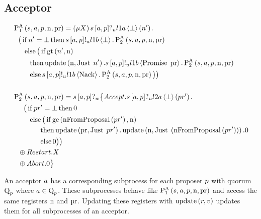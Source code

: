 \subsection{Acceptor}
\begin{align*}
&\operatorname{P^{A}_{1}}\left(s, a, p, \operatorname{n}, \operatorname{pr}\right) = \left(\mu X\right) s\left[a, p\right]?_u l1a \left\langle \bot \right\rangle \left(n'\right) .\\
&\hspace*{0.75em * 1}\big ( \operatorname{if} n' = \bot \operatorname{then} s\left[a, p\right]!_u l1b \left\langle \bot \right\rangle.\operatorname{P^{A}_{2}}\left(s, a, p, \operatorname{n}, \operatorname{pr}\right)\\
&\hspace*{0.75em * 2}\operatorname{else} \big( \operatorname{if} \operatorname{gt}\left(n', \operatorname{n}\right)\\
&\hspace*{0.75em * 3}\operatorname{then} \operatorname{update} \left(\operatorname{n}, \operatorname{Just}\; n'\right).s\left[a, p\right]!_u l1b \left\langle \operatorname{Promise}\; \operatorname{pr} \right\rangle.\operatorname{P^{A}_{2}}\left(s, a, p, \operatorname{n}, \operatorname{pr}\right)\\
&\hspace*{0.75em * 3}\operatorname{else} s\left[a, p\right]!_u l1b \left\langle \operatorname{Nack} \right\rangle.\operatorname{P^{A}_{2}}\left(s, a, p, \operatorname{n}, \operatorname{pr}\right)
\big ) \big )
\\\\
&\operatorname{P^{A}_{2}}\left(s, a, p, \operatorname{n}, \operatorname{pr}\right) = s\left[a, p\right]?_w \big\{\mathnormal{Accept} . s\left[a, p\right]?_u l2a \left\langle \bot \right\rangle \left(pr'\right) .\\
&\hspace*{0.75em * 2}\big( \operatorname{if} pr' = \bot \operatorname{then} 0\\
&\hspace*{0.75em * 3}\operatorname{else} \big( \operatorname{if} \operatorname{ge}\left(\operatorname{nFromProposal}\left(pr' \right), \operatorname{n}\right)\\
&\hspace*{0.75em * 5}\operatorname{then} \operatorname{update} \left(\operatorname{pr}, \operatorname{Just}\; pr'\right) . \operatorname{update} \left(\operatorname{n}, \operatorname{Just}\; \left(\operatorname{nFromProposal}\left(pr' \right)\right)\right).0\\
&\hspace*{0.75em * 5}\operatorname{else} 0 \big ) \big )\\
&\hspace*{0.75em * 1} \oplus \mathnormal{Restart}.X\\
&\hspace*{0.75em * 1} \oplus \mathnormal{Abort}.0
\big\}
\end{align*}

An acceptor $a$ has a corresponding subprocess for each proposer $p$ with quorum $\operatorname{Q}_{p}$ where $a\in\operatorname{Q}_{p}$.
These subprocesses behave like $\operatorname{P^{A}_{1}}\left(
    s,
    a,
    p,
    \operatorname{n},
    \operatorname{pr}
\right)$ and access the same registers $\operatorname{n}$ and $\operatorname{pr}$.
Updating these registers with $\operatorname{update} \left(r, v\right)$ updates them for all subprocesses of an acceptor.

